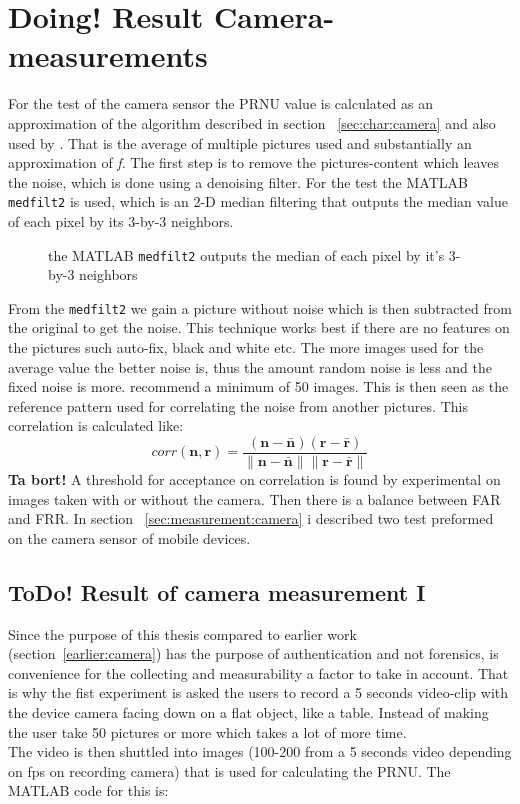 \section{\textbf{Doing! }Result Camera-measurements}\label{sec:ResCam}
For the test of the camera sensor the PRNU value is calculated as an approximation of the algorithm described in section ~\ref{sec:char:camera} and also used by \cite{sensor:camera:DCIdent}. That is the average of multiple pictures used and substantially an approximation of \textit{f}. The first step is to remove the pictures-content which leaves the noise, which is done using a denoising filter. For the test the MATLAB \texttt{medfilt2} is used, which is an 2-D median filtering that outputs the median value of each pixel by its 3-by-3 neighbors. 
\begin{figure}[H]
  \centering
  
  \caption{\label{fig:medfilt2} the MATLAB \texttt{medfilt2} outputs the median of each pixel by it's 3-by-3 neighbors}
\end{figure}
From the \texttt{medfilt2} we gain a picture without noise which is then subtracted from the original to get the noise. This technique works best if there are no features on the pictures such auto-fix, black and white etc. The more images used for the average value the better noise is, thus the amount random noise is less and the fixed noise is more. \cite{sensor:camera:DCIdent} recommend a minimum of 50 images. This is then seen as the reference pattern used for correlating the noise from another pictures. This correlation is calculated like:
$$
corr(\boldsymbol{n},\boldsymbol{r}) = 
\frac{(\boldsymbol{n} - \bar{\boldsymbol{n}})(\boldsymbol{r} - \bar{\boldsymbol{r}})}
{\|\boldsymbol{n} - \bar{\boldsymbol{n}}\| \|\boldsymbol{r} - \bar{\boldsymbol{r}}\|}
$$
\textbf{Ta bort! }A threshold for acceptance on correlation is found by experimental on images taken with or without the camera. Then there is a balance between FAR and FRR. 
In section ~\ref{sec:measurement:camera} i described two test preformed on the camera sensor of mobile devices.
\subsection{\textbf{ToDo! }Result of camera measurement I}
Since the purpose of this thesis compared to earlier work (section~\ref{earlier:camera}) has the purpose of authentication and not forensics, is convenience for the collecting and measurability a factor to take in account. That is why the fist experiment is asked the users to record a 5 seconds video-clip with the device camera facing down on a flat object, like a table. Instead of making the user take 50 pictures or more which takes a lot of more time. \\
The video is then shuttled into images (100-200 from a 5 seconds video depending on fps on recording camera) that is used for calculating the PRNU. The MATLAB code for this is:\\


